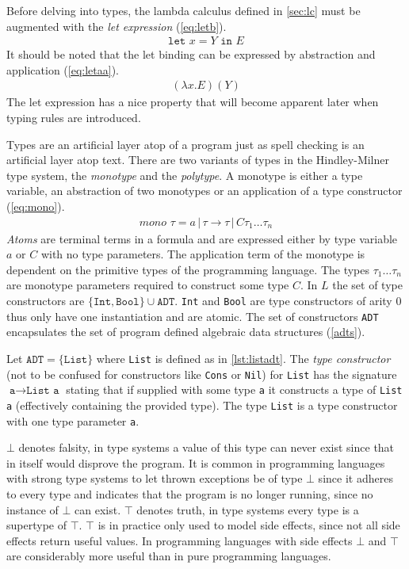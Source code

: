 \documentclass[11pt,oneside,a4paper]{report}
\begin{document}
Before delving into types, the lambda calculus defined in \autoref{sec:lc} must be augmented with the \textit{let expression} (\autoref{eq:letb}).
\begin{align}
	\texttt{let } x = Y \texttt{ in } E
	\label{eq:letb}
\end{align}
It should be noted that the let binding can be expressed by abstraction and application (\autoref{eq:letaa}).
\begin{align}
	(\lambda x . E) (Y)
	\label{eq:letaa}
\end{align}
The let expression has a nice property that will become apparent later when typing rules are introduced.

Types are an artificial layer atop of a program just as spell checking is an artificial layer atop text.
There are two variants of types in the Hindley-Milner type system, the \textit{monotype} and the \textit{polytype}.
A monotype is either a type variable, an abstraction of two monotypes or an application of a type constructor (\autoref{eq:mono}).
\begin{align}
	mono \,\,\tau = a \,|\, \tau \rightarrow \tau \,|\, C \tau_1 \dots \tau_n
	\label{eq:mono}
\end{align}
\textit{Atoms} are terminal terms in a formula and are expressed either by type variable $a$ or $C$ with no type parameters.
The application term of the monotype is dependent on the primitive types of the programming language.
The types $\tau_1 \dots \tau_n$ are monotype parameters required to construct some type $C$.
In $L$ the set of type constructors are $\{ \texttt{Int}, \texttt{Bool} \} \cup \texttt{ADT}$.
\texttt{Int} and \texttt{Bool} are type constructors of arity 0 thus only have one instantiation and are atomic.
The set of constructors \texttt{ADT} encapsulates the set of program defined algebraic data structures (\autoref{adts}).
\begin{exmp}
    Let $\texttt{ADT} = \{ \texttt{List} \}$ where \texttt{List} is defined as in \autoref{lst:listadt}.
    The \textit{type constructor} (not to be confused for constructors like \texttt{Cons} or \texttt{Nil}) for \texttt{List} has the signature $\texttt{a} \rightarrow \texttt{List a}$ stating that if supplied with some type \texttt{a} it constructs a type of \texttt{List a} (effectively containing the provided type).
    The type \texttt{List} is a type constructor with one type parameter \texttt{a}.
\end{exmp}

$\bot$ denotes falsity, in type systems a value of this type can never exist since that in itself would disprove the program.
It is common in programming languages with strong type systems to let thrown exceptions be of type $\bot$ since it adheres to every type and indicates that the program is no longer running, since no instance of $\bot$ can exist.
$\top$ denotes truth, in type systems every type is a supertype of $\top$.
$\top$ is in practice only used to model side effects, since not all side effects return useful values.
In programming languages with side effects $\bot$ and $\top$ are considerably more useful than in pure programming languages.
\end{document}
